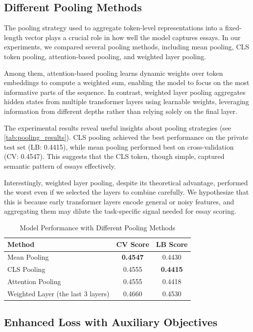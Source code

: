 \documentclass[12pt]{article}
\begin{document}
\subsection{Different Pooling Methods}
\label{sec:pooling}
The pooling strategy used to aggregate token-level representations into a fixed-length vector plays a crucial role in how well the model captures essays. In our experiments, we compared several pooling methods, including mean pooling, CLS token pooling, attention-based pooling, and weighted layer pooling.

Among them, attention-based pooling learns dynamic weights over token embeddings to compute a weighted sum, enabling the model to focus on the most informative parts of the sequence. In contrast, weighted layer pooling aggregates hidden states from multiple transformer layers using learnable weights, leveraging information from different depths rather than relying solely on the final layer.

The experimental results reveal useful insights about pooling strategies (see \autoref{tab:pooling_results}). CLS pooling achieved the best performance on the private test set (LB: 0.4415), while mean pooling performed best on cross-validation (CV: 0.4547). This suggests that the CLS token, though simple, captured semantic pattern of essays effectively. 

Interestingly, weighted layer pooling, despite its theoretical advantage, performed the worst even if we selected the layers to combine carefully. We hypothesize that this is because early transformer layers encode general or noisy features, and aggregating them may dilute the task-specific signal needed for essay scoring.

\begin{table}[H]
\centering
\caption{Model Performance with Different Pooling Methods}
\label{tab:pooling_results}
\begin{tabular}{lcc}
\hline
\textbf{Method} & \textbf{CV Score} & \textbf{LB Score} \\
\hline
Mean Pooling & \textbf{0.4547} & 0.4430 \\
CLS Pooling & 0.4555 & \textbf{0.4415} \\
Attention Pooling & 0.4555 & 0.4418 \\
Weighted Layer (the last 3 layers) & 0.4660 & 0.4530 \\
\hline
\end{tabular}
\end{table}


\subsection{Enhanced Loss with Auxiliary Objectives}
\end{document}
